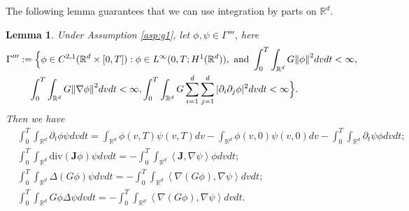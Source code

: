 \documentclass[a4paper, 11pt]{article}
\newcommand{\inner}[2]{\left< #1 , #2 \right>}
\newcounter{results}[section]
\theoremstyle{plain}
\newtheorem{lemma}[results]{Lemma}
\theoremstyle{remark}
\theoremstyle{definition}
\renewcommand{\div}{\mathrm{div}}
\newcommand{\intd}{\int_{\mathbb{R}^d}}
\newcommand{\intt}{\int_0^T}
\newcommand{\J}{\boldsymbol{J}}
\begin{document}
The following lemma guarantees that we can use integration by parts on $\mathbb{R}^d$.

\begin{lemma}\label{lm:27}Under Assumption \ref{asp:g1}, let $\phi,\psi\in\Gamma'''$, here 
\begin{equation}
	\begin{aligned}
		\Gamma'''&:=\Big\{\phi\in C^{2,1}(\mathbb{R}^d\times [0,T]): \phi\in  L^{\infty}(0,T;H^1(\mathbb{R}^d)),\text{ and }\intt\intd G\norm{\phi}^2dvdt<\infty,\\
		&\quad \intt\intd G\norm{\nabla\phi}^2dvdt<\infty, \intt\intd G\sum_{i=1}^d\sum_{j=1}^d|\partial_i\partial_j\phi|^2dvdt<\infty\Big\}.
	\end{aligned}
\end{equation}
Then we have
	\begin{align}
		&\intt\intd \partial_t\phi\psi dvdt=\intd \phi(v,T)\psi(v,T)dv-\intd \phi(v,0)\psi(v,0)dv-\intt\intd \partial_t\psi\phi dvdt;\\
		&\intt\intd\div\left(\J\phi\right)\psi dvdt=-\intt\intd \inner{\J}{\nabla\psi}\phi dvdt;\\
		&\intt\intd \Delta\left(G\phi\right)\psi dvdt=-\intt\intd \inner{\nabla\left(G\phi\right)}{\nabla\psi}dvdt;\\
		&\intt\intd G\phi\Delta\psi dvdt=-\intt\intd \inner{\nabla\left(G\phi\right)}{\nabla\psi}dvdt.
	\end{align}
	
\end{lemma}
\end{document}
